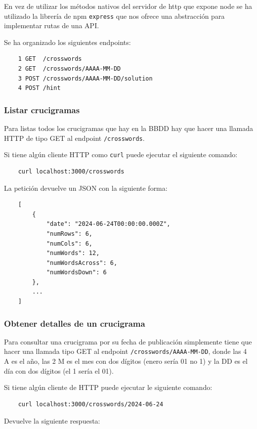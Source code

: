 \documentclass[12pt, a4paper]{article}
\begin{document}
En vez de utilizar los métodos nativos del servidor de http que expone node se ha
utilizado la librería de npm \verb*|express| que nos ofrece una abstracción para 
implementar rutas de una API.

Se ha organizado los siguientes endpoints:

\begin{verbatim}
	1 GET  /crosswords
	2 GET  /crosswords/AAAA-MM-DD
	3 POST /crosswords/AAAA-MM-DD/solution
	4 POST /hint
\end{verbatim}

\subsubsection{Listar crucigramas}

Para listas todos los crucigramas que hay en la BBDD hay que hacer una llamada
HTTP de tipo GET al endpoint \verb*|/crosswords|.

Si tiene algún cliente HTTP como \verb*|curl| puede ejecutar el siguiente
comando:

\begin{verbatim}
	curl localhost:3000/crosswords
\end{verbatim}

La petición devuelve un JSON con la siguiente forma:

\begin{verbatim}
	[
		{
			"date": "2024-06-24T00:00:00.000Z",
			"numRows": 6,
			"numCols": 6,
			"numWords": 12,
			"numWordsAcross": 6,
			"numWordsDown": 6
		},
		...
	]
\end{verbatim}

\subsubsection{Obtener detalles de un crucigrama}

Para consultar una crucigrama por su fecha de publicación simplemente tiene
que hacer una llamada tipo GET al endpoint \verb*|/crosswords/AAAA-MM-DD|,
donde las 4 A es el año, las 2 M es el mes con dos dígitos (enero sería
01 no 1) y la DD es el día con dos dígitos (el 1 sería el 01).

Si tiene algún cliente de HTTP puede ejecutar le siguiente comando:

\begin{verbatim}
	curl localhost:3000/crosswords/2024-06-24
\end{verbatim}

Devuelve la siguiente respuesta:
\end{document}

